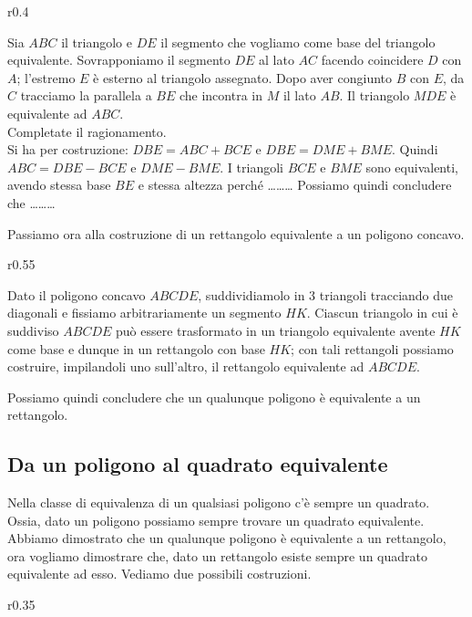 \begin{wrapfigure}{r}{0.4\textwidth}
	\centering
\end{wrapfigure}
Sia $ABC$ il triangolo e $DE$ il segmento che vogliamo come base del 
triangolo equivalente.
Sovrapponiamo il segmento $DE$ al lato $AC$ facendo coincidere $D$ 
con $A$; l'estremo $E$ è esterno al triangolo assegnato. Dopo aver 
congiunto $B$ con $E$, da $C$ tracciamo la parallela a $BE$ che 
incontra in $M$ il lato $AB$. Il triangolo $MDE$ è equivalente ad 
$ABC$.\\
Completate il ragionamento.\\
Si ha per costruzione: 
$DBE=ABC+BCE$ e $DBE=DME+BME$.
Quindi $ABC=DBE-BCE$ e $DME-BME$.
I triangoli $BCE$ e $BME$ sono equivalenti, avendo stessa base $BE$ e 
stessa altezza perché \ldots\ldots\ldots{}	Possiamo quindi 
concludere che \ldots\ldots\ldots{}

Passiamo ora alla costruzione di un rettangolo equivalente a un 
poligono concavo.

\begin{wrapfigure}{r}{0.55\textwidth}
	\centering
\end{wrapfigure}
Dato il poligono concavo $ABCDE$, suddividiamolo in 3 triangoli 
tracciando due diagonali e fissiamo arbitrariamente un segmento $HK$. 
Ciascun triangolo in cui è suddiviso $ABCDE$ può essere trasformato 
in un triangolo equivalente avente $HK$ come base e dunque in un 
rettangolo con base $HK$; con tali rettangoli possiamo costruire, 
impilandoli uno sull'altro, il rettangolo equivalente ad $ABCDE$.

Possiamo quindi concludere che un qualunque poligono è equivalente a 
un rettangolo.

\subsection{Da un poligono al quadrato equivalente}

Nella classe di equivalenza di un qualsiasi poligono c'è sempre un 
quadrato. Ossia, dato un poligono possiamo sempre trovare un quadrato 
equivalente.
Abbiamo dimostrato che un qualunque poligono è equivalente a un 
rettangolo, ora vogliamo dimostrare che, dato un rettangolo esiste 
sempre un quadrato equivalente ad esso.
Vediamo due possibili costruzioni.

\begin{wrapfigure}{r}{0.35\textwidth}
	
\centering\vspace{6pt}\\
	
\centering\vspace{6pt}
\\
	\centering
\end{wrapfigure}
